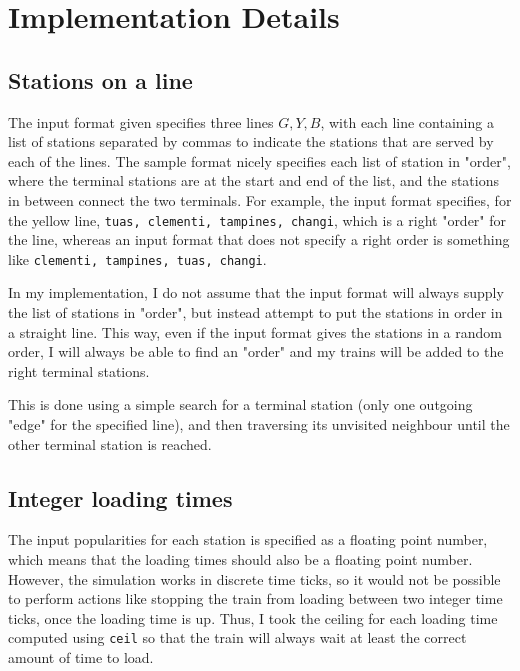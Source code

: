 \documentclass[12pt]{article}
\begin{document}
\section{Implementation Details}

\subsection{Stations on a line}

The input format given specifies three lines $G, Y, B$, with each line containing a list of stations separated by commas to indicate the stations that are served by each of the lines. The sample format nicely specifies each list of station in "order", where the terminal stations are at the start and end of the list, and the stations in between connect the two terminals. For example, the input format specifies, for the yellow line, \verb!tuas, clementi, tampines, changi!, which is a right "order" for the line, whereas an input format that does not specify a right order is something like \verb!clementi, tampines, tuas, changi!.

\bigbreak \noindent In my implementation, I do not assume that the input format will always supply the list of stations in "order", but instead attempt to put the stations in order in a straight line. This way, even if the input format gives the stations in a random order, I will always be able to find an "order" and my trains will be added to the right terminal stations.

\bigbreak \noindent This is done using a simple search for a terminal station (only one outgoing "edge" for the specified line), and then traversing its unvisited neighbour until the other terminal station is reached.

\subsection{Integer loading times}

The input popularities for each station is specified as a floating point number, which means that the loading times should also be a floating point number. However, the simulation works in discrete time ticks, so it would not be possible to perform actions like stopping the train from loading between two integer time ticks, once the loading time is up. Thus, I took the ceiling for each loading time computed using \verb!ceil! so that the train will always wait at least the correct amount of time to load.
\end{document}
